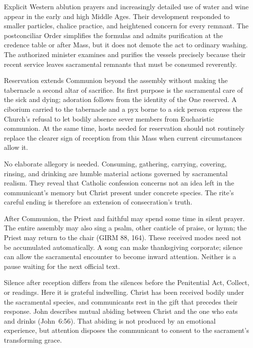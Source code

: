 Explicit Western ablution prayers and increasingly detailed use of water and wine appear in the early and high Middle Ages. Their development responded to smaller particles, chalice practice, and heightened concern for every remnant. The postconciliar Order simplifies the formulas and admits purification at the credence table or after Mass, but it does not demote the act to ordinary washing. The authorized minister examines and purifies the vessels precisely because their recent service leaves sacramental remnants that must be consumed reverently.

Reservation extends Communion beyond the assembly without making the tabernacle a second altar of sacrifice. Its first purpose is the sacramental care of the sick and dying; adoration follows from the identity of the One reserved. A ciborium carried to the tabernacle and a pyx borne to a sick person express the Church's refusal to let bodily absence sever members from Eucharistic communion. At the same time, hosts needed for reservation should not routinely replace the clearer sign of reception from this Mass when current circumstances allow it.

No elaborate allegory is needed. Consuming, gathering, carrying, covering, rinsing, and drinking are humble material actions governed by sacramental realism. They reveal that Catholic confession concerns not an idea left in the communicant's memory but Christ present under concrete species. The rite's careful ending is therefore an extension of consecration's truth.


After Communion, the Priest and faithful may spend some time in silent prayer. The entire assembly may also sing a psalm, other canticle of praise, or hymn; the Priest may return to the chair (GIRM 88, 164). These received modes need not be accumulated automatically. A song can make thanksgiving corporate; silence can allow the sacramental encounter to become inward attention. Neither is a pause waiting for the next official text.

Silence after reception differs from the silences before the Penitential Act, Collect, or readings. Here it is grateful indwelling. Christ has been received bodily under the sacramental species, and communicants rest in the gift that precedes their response. John describes mutual abiding between Christ and the one who eats and drinks (John~6:56). That abiding is not produced by an emotional experience, but attention disposes the communicant to consent to the sacrament's transforming grace.

